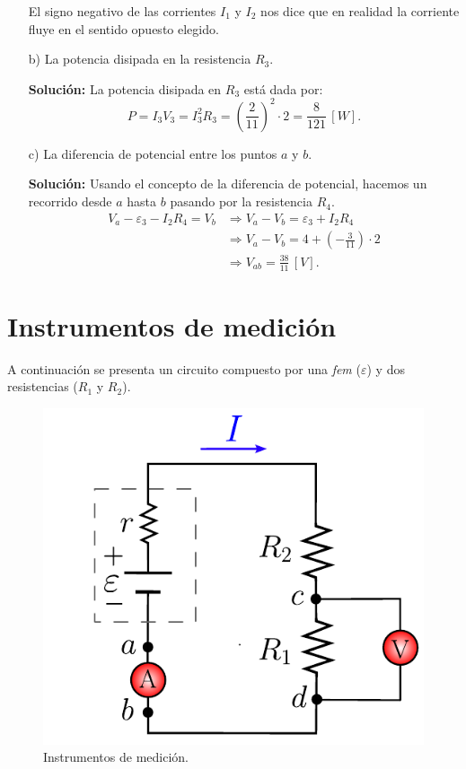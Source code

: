 \begin{ejemplo}
\begin{itemize}
El signo negativo de las corrientes $I_1$ y $I_2$ nos dice que en realidad la corriente fluye en el sentido opuesto elegido.

\item[b)] La potencia disipada en la resistencia $R_3$.

\textbf{Solución:} La potencia disipada en $R_3$ está dada por:
$$P = I_3 V_3 = I_3^2 R_3 = \left( \frac{2}{11}\right)^2 \cdot 2 = \frac{8}{121} \,[W].$$

\item[c)] La diferencia de potencial entre los puntos $a$ y $b$.

\textbf{Solución:} Usando el concepto de la diferencia de potencial, hacemos un recorrido desde $a$ hasta $b$ pasando por la resistencia $R_4$.
\begin{align*}
  V_a - \varepsilon_3 - I_2 R_4 = V_b 
&\Rightarrow  V_a - V_b = \varepsilon_3 + I_2 R_4 \\
&\Rightarrow   V_a - V_b = 4 + \left( - \frac{3}{11} \right) \cdot 2  \\
 &\Rightarrow  V_{ab} =  \frac{38}{11} \,[V].  
\end{align*}

\end{itemize} 
\end{ejemplo}

\section{Instrumentos de medición}

A continuación se presenta un circuito compuesto por una \textit{fem} ($\varepsilon$) y dos resistencias ($R_1$ y $R_2$).

\begin{figure}[H]
    \centering
    \includegraphics[scale = 0.8]{Figuras/Instrumentos-Medida.pdf}
    \caption{Instrumentos de medición.}
    \label{fig:Instrumentos}
\end{figure}

